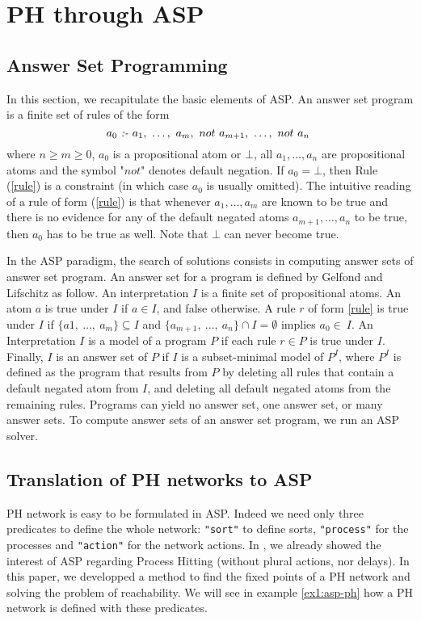 
\section{PH through ASP}
\label{sec:ph-asp}
\subsection{Answer Set Programming}

	In this section, we recapitulate the basic elements of ASP.
	An answer set program is a finite set of rules of the form
	\begin{equation}
		\label{rule}
		a_{0}\ \emph{:-}\ a_{1},\ \ldots,\ a_{m},\ not\ a_{m+1},\ \ldots,\ not\ a_{n}\
	\end{equation}
	where $n \ge m \ge 0$, $a_{0}$ is a propositional atom or $\bot$, all
	$a_{1}, \ldots ,a_{n}$ are propositional atoms and the symbol "$not$" denotes default negation.
	If $a_{0} = \bot$, then Rule (\ref{rule}) is a constraint (in which case $a_{0}$ is usually omitted).
	The intuitive reading of a rule of form (\ref{rule}) is that whenever $a_{1}, \ldots, a_{m}$
	are known to be true and there is no evidence for any of the default negated atoms $a_{m+1}, \ldots, a_{n}$ to be true, then $a_{0}$ has to be true as well.
	Note that $\bot$ can never become true.
	
	In the ASP paradigm, the search of solutions consists in computing answer sets of answer set program.
	An answer set for a program is defined by Gelfond and Lifschitz \cite{DBLP:conf/iclp/GelfondL88} as follow.
	An interpretation $I$ is a finite set of propositional atoms.
	An atom $a$ is true under $I$ if $a \in I$, and false otherwise.
	A rule $r$ of form \ref{rule} is true under $I$ if $\{a1,\ \dots,\ a_{m}\} \subseteq I$ and $\{a_{m+1},\ \ldots,\ a_{n}\} \cap I = \emptyset$ implies $a_{0} \in\ I$.
	An Interpretation $I$ is a model of a program $P$ if each rule $r \in P$ is true under $I$.
	Finally, $I$ is an answer set of $P$ if $I$ is a subset-minimal model of $P^{I}$,
	where $P^{I}$ is defined as the program that results from $P$ by deleting all rules that contain a default negated atom from $I$, 
	and deleting all default negated atoms from the remaining rules.
	Programs can yield no answer set, one answer set, or many answer sets.
	To compute answer sets of an answer set program, we run an ASP solver.

\subsection{Translation of PH networks to ASP}
PH network is easy to be formulated in ASP. Indeed we need only three predicates to define the whole network:
\texttt{"sort"} to define sorts, \texttt{"process"} for the processes and \texttt{"action"} for the network actions.
In \cite{MOVEP14}, we already showed the interest of ASP regarding Process Hitting (without plural actions, nor delays). 
In this paper, we developped a method to find the fixed points of a PH network and solving the problem of reachability.
We will see in example \ref{ex1:asp-ph} how a PH network is defined with these predicates.


